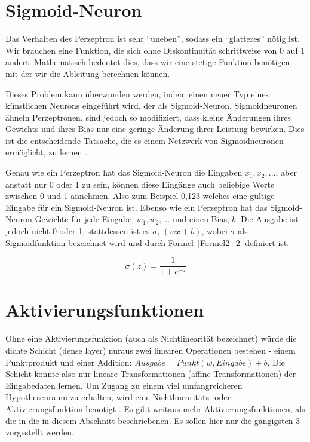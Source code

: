 \section{Sigmoid-Neuron}
Das Verhalten des Perzeptron ist sehr  \enquote{uneben}, sodass ein \enquote{glatteres} nötig ist. Wir brauchen eine Funktion, die sich ohne Diskontinuität schrittweise von 0 auf 1 ändert. Mathematisch bedeutet dies, dass wir eine stetige Funktion benötigen, mit der wir die Ableitung berechnen können.

Dieses Problem kann überwunden werden, indem einen neuer Typ eines künstlichen Neurons eingeführt wird, der als Sigmoid-Neuron. Sigmoidneuronen ähneln Perzeptronen, sind jedoch so modifiziert, dass kleine Änderungen ihres Gewichts und ihres Bias nur eine geringe Änderung ihrer Leistung bewirken. Dies ist die entscheidende Tatsache, die es einem Netzwerk von Sigmoidneuronen ermöglicht, zu lernen \cite*[8]{Nielsen2015}.

Genau wie ein Perzeptron hat das Sigmoid-Neuron die Eingaben $x_1, x_2, ...$, aber anstatt nur 0 oder 1 zu sein, können diese Eingänge auch beliebige Werte zwischen 0 und 1 annehmen. Also zum Beispiel 0,123 welches eine gültige Eingabe für ein Sigmoid-Neuron ist. Ebenso wie ein Perzeptron hat das Sigmoid-Neuron Gewichte für jede Eingabe, $w_1, w_2, ...$ und einen Bias, $b$. Die Ausgabe ist jedoch nicht 0 oder 1, stattdessen ist es $\sigma$, $(wx + b)$, wobei $\sigma$ als Sigmoidfunktion bezeichnet wird und durch Formel~\ref{Formel2_2} definiert ist.

\begin{equation} \label{Formel2_2}
  \sigma (z) = \frac{1}{1+e^{-z}}
\end{equation}


\section{Aktivierungsfunktionen}
Ohne eine Aktivierungsfunktion (auch als Nichtlinearität bezeichnet) würde die dichte Schicht (dense layer) nuraus zwei linearen Operationen bestehen - einem Punktprodukt und einer Addition: $Ausgabe = Punkt (w, Eingabe) + b$. Die Schicht konnte also nur lineare Transformationen (affine Transformationen) der Eingabedaten lernen. Um Zugang zu einem viel umfangreicheren Hypothesenraum zu erhalten, wird eine Nichtlinearitäts- oder Aktivierungsfunktion benötigt \cite*[S. 72]{Chollet2017}. Es gibt weitaus mehr Aktivierungsfunktionen, als die in die in diesem Abschnitt beschriebenen. Es sollen hier nur die gängigsten 3 vorgestellt werden.

